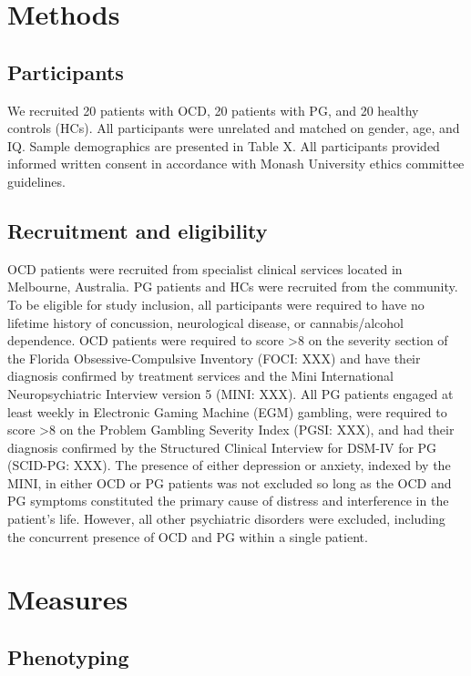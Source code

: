 \section{Methods}

\subsection{Participants}

We recruited 20 patients with OCD, 20 patients with PG, and 20 healthy controls (HCs). All participants were unrelated and matched on gender, age, and IQ. Sample demographics are presented in Table X. All participants provided informed written consent in accordance with Monash University ethics committee guidelines.

\subsection{Recruitment and eligibility}

OCD patients were recruited from specialist clinical services located in Melbourne, Australia. PG patients and HCs were recruited from the community. To be eligible for study inclusion, all participants were required to have no lifetime history of concussion, neurological disease, or cannabis/alcohol dependence. OCD patients were required to score >8 on the severity section of the Florida Obsessive-Compulsive Inventory (FOCI: XXX) and have their diagnosis confirmed by treatment services and the Mini International Neuropsychiatric Interview version 5 (MINI: XXX). All PG patients engaged at least weekly in Electronic Gaming Machine (EGM) gambling, were required to score >8 on the Problem Gambling Severity Index (PGSI: XXX), and had their diagnosis confirmed by the Structured Clinical Interview for DSM-IV for PG (SCID-PG: XXX). The presence of either depression or anxiety, indexed by the MINI, in either OCD or PG patients was not excluded so long as the OCD and PG symptoms constituted the primary cause of distress and interference in the patient’s life. However, all other psychiatric disorders were excluded, including the concurrent presence of OCD and PG within a single patient.

\section{Measures}

\subsection{Phenotyping}
	

